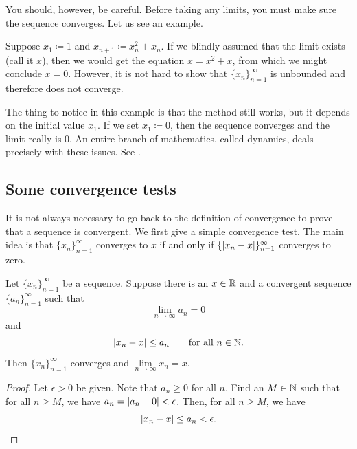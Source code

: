 You should, however, be careful.  Before taking any limits, you must
make sure the sequence converges.  Let us see an example.

\begin{example}
Suppose $x_1 \coloneqq 1$ and $x_{n+1} \coloneqq x_n^2+x_n$.
If we blindly assumed that the limit exists (call it $x$), then we
would get the equation $x = x^2+x$, from which we might
conclude $x=0$.  However, it is not hard
to show that $\{ x_n \}_{n=1}^\infty$ is unbounded and therefore does not converge.

The thing to notice in this example is that the method still works, but
it depends on the initial value $x_1$.  If we set $x_1 \coloneqq 0$,
then the sequence converges and the limit really is 0.
An entire branch of mathematics, called dynamics, deals precisely with these
issues.
See
.
\end{example}

\subsection{Some convergence tests}

It is not always necessary to go back to the definition of convergence
to prove that a sequence is convergent.  We first give a simple convergence test.
The main idea is that 
$\{ x_n \}_{n=1}^\infty$ converges to $x$ if and only if 
$\{ \left\lvert { x_n - x } \right\rvert \}_{n=1}^\infty$ converges to zero.

\begin{prop} \label{convzero:prop}
Let $\{ x_n \}_{n=1}^\infty$ be a sequence. 
Suppose there is an $x \in {\mathbb{R}}$
and a convergent sequence $\{ a_n \}_{n=1}^\infty$
such that
\begin{equation*}
\lim_{n\to\infty} a_n = 0
\end{equation*}
and 
\begin{equation*}
\left\lvert {x_n - x} \right\rvert \leq a_n
\qquad
\text{for all $n \in {\mathbb{N}}$.}
\end{equation*}
Then $\{ x_n \}_{n=1}^\infty$ converges and $\lim\limits_{n\to\infty} x_n = x$.
\end{prop}

\begin{proof}
Let $\epsilon > 0$ be given.  Note that $a_n \geq 0$
for all $n$.  Find an $M \in {\mathbb{N}}$ such that for
all $n \geq M$, we have
$a_n = \left\lvert {a_n - 0} \right\rvert < \epsilon$.  Then, for all $n \geq M$,
we have
\begin{equation*}
\left\lvert {x_n - x} \right\rvert \leq a_n < \epsilon . \qedhere
\end{equation*}
\end{proof}

